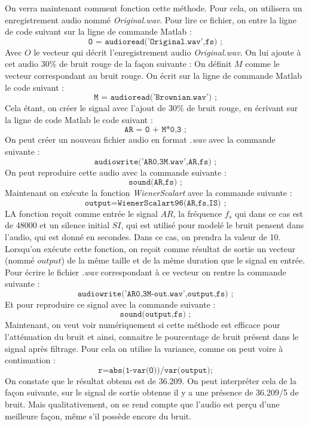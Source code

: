 \documentclass[conference,onecolumn]{IEEEtran}
\begin{document}
\medskip
On verra maintenant comment fonction cette méthode. Pour cela, on utilisera un enregistrement audio nommé \textit{Original.wav}. Pour lire ce fichier, on entre la ligne de code suivant sur la ligne de commande Matlab :
\[\texttt{O = audioread('Original.wav',fs) } \texttt{;}\]
Avec $O$ le vecteur qui décrit l’enregistrement audio \textit{Original.wav}.
\medskip 
On lui ajoute à cet audio 30\% de bruit rouge de la façon suivante :
On définit $M$ comme le vecteur correspondant au bruit rouge.
On écrit sur la ligne de commande Matlab le code suivant :
\[\texttt{M = audioread('Brownian.wav') } \texttt{;}\]
Cela étant, on créer le signal avec l’ajout de 30\% de bruit rouge, en écrivant sur la ligne de code Matlab le code suivant :
\[\texttt{AR = O + M*0,3 } \texttt{;}\]
\medskip
On peut créer un nouveau fichier audio en format \textit{.wav} avec la commande suivante :
\[\texttt{audiowrite('AR0,3M.wav',AR,fs) } \texttt{;}\]
On peut reproduire cette audio avec la commande suivante :
\[\texttt{sound(AR,fs) } \texttt{;}\]
Maintenant on exécute la fonction \textit{WienerScalart} avec la commande suivante :
\[\texttt{output=WienerScalart96(AR,fs,IS) } \texttt{;}\]
LA fonction reçoit comme entrée le signal $AR$, la fréquence $f_s$ qui dans ce cas est de $48000$ et un silence initial $SI$, qui est utilisé pour modelé le bruit pensent dans l’audio, qui est donné en secondes. Dans ce cas, on prendra la valeur de 10. 
Lorsqu’on exécute cette fonction, on reçoit comme résultat de sortie un vecteur (nommé $output$) de la même taille et de la même duration que le signal en entrée.
Pour écrire le fichier \textit{.wav} correspondant  à ce vecteur on rentre la commande suivante :
\[\texttt{audiowrite('AR0,3M-out.wav',output,fs) } \texttt{;}\]
Et pour reproduire ce signal avec la commande suivante :
\[\texttt{sound(output,fs) } \texttt{;}\]
Maintenant, on veut voir numériquement si cette méthode est efficace pour l’atténuation du bruit et ainsi, connaitre le pourcentage de bruit présent dans le signal après filtrage. Pour cela on utilise la variance, comme on peut voire à continuation :
\[\texttt{r=abs(1-var(O))/var(output)} \texttt{;}\]
On constate que le résultat obtenu est de 36.209. On peut interpréter cela de la façon suivante, sur le signal de sortie obtenue il y a une présence de 36.209/5 de bruit. Mais qualitativement, on se rend compte que l’audio est perçu d’une meilleure façon, même s’il possède encore du bruit. 
\medskip 
\end{document}
